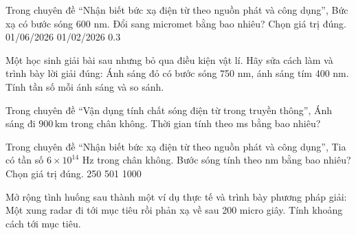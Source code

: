 \begin{ex}
Trong chuyên đề “Nhận biết bức xạ điện từ theo nguồn phát và công dụng”, Bức xạ có bước sóng 600 nm. Đổi sang micromet bằng bao nhiêu? Chọn giá trị đúng.
\choice
{01/06/2026}
{}
{01/02/2026}
{0.3}
\end{ex}

\begin{ex}
Một học sinh giải bài sau nhưng bỏ qua điều kiện vật lí. Hãy sửa cách làm và trình bày lời giải đúng: Ánh sáng đỏ có bước sóng 750 nm, ánh sáng tím 400 nm. Tính tần số mỗi ánh sáng và so sánh.
\choiceTF

\end{ex}

\begin{ex}
Trong chuyên đề “Vận dụng tính chất sóng điện từ trong truyền thông”, Ánh sáng đi $900\,\text{km}$ trong chân không. Thời gian tính theo ms bằng bao nhiêu?
\end{ex}

\begin{ex}
Trong chuyên đề “Nhận biết bức xạ điện từ theo nguồn phát và công dụng”, Tia có tần số $6\times10^{14}$ Hz trong chân không. Bước sóng tính theo nm bằng bao nhiêu? Chọn giá trị đúng.
\choice
{250}
{501}
{}
{1000}
\end{ex}

\begin{ex}
Mở rộng tình huống sau thành một ví dụ thực tế và trình bày phương pháp giải: Một xung radar đi tới mục tiêu rồi phản xạ về sau 200 micro giây. Tính khoảng cách tới mục tiêu.
\choiceTF

\end{ex}

